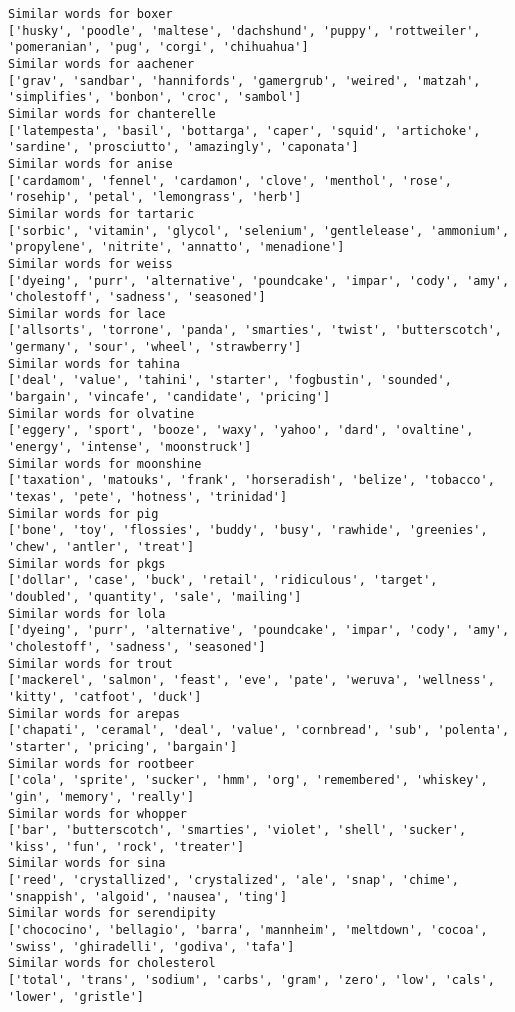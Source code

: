 \documentclass[11pt]{article}
\begin{document}
\begin{Verbatim}[commandchars=\\\{\}]
Similar words for boxer
['husky', 'poodle', 'maltese', 'dachshund', 'puppy', 'rottweiler', 'pomeranian', 'pug', 'corgi', 'chihuahua']
Similar words for aachener
['grav', 'sandbar', 'hannifords', 'gamergrub', 'weired', 'matzah', 'simplifies', 'bonbon', 'croc', 'sambol']
Similar words for chanterelle
['latempesta', 'basil', 'bottarga', 'caper', 'squid', 'artichoke', 'sardine', 'prosciutto', 'amazingly', 'caponata']
Similar words for anise
['cardamom', 'fennel', 'cardamon', 'clove', 'menthol', 'rose', 'rosehip', 'petal', 'lemongrass', 'herb']
Similar words for tartaric
['sorbic', 'vitamin', 'glycol', 'selenium', 'gentlelease', 'ammonium', 'propylene', 'nitrite', 'annatto', 'menadione']
Similar words for weiss
['dyeing', 'purr', 'alternative', 'poundcake', 'impar', 'cody', 'amy', 'cholestoff', 'sadness', 'seasoned']
Similar words for lace
['allsorts', 'torrone', 'panda', 'smarties', 'twist', 'butterscotch', 'germany', 'sour', 'wheel', 'strawberry']
Similar words for tahina
['deal', 'value', 'tahini', 'starter', 'fogbustin', 'sounded', 'bargain', 'vincafe', 'candidate', 'pricing']
Similar words for olvatine
['eggery', 'sport', 'booze', 'waxy', 'yahoo', 'dard', 'ovaltine', 'energy', 'intense', 'moonstruck']
Similar words for moonshine
['taxation', 'matouks', 'frank', 'horseradish', 'belize', 'tobacco', 'texas', 'pete', 'hotness', 'trinidad']
Similar words for pig
['bone', 'toy', 'flossies', 'buddy', 'busy', 'rawhide', 'greenies', 'chew', 'antler', 'treat']
Similar words for pkgs
['dollar', 'case', 'buck', 'retail', 'ridiculous', 'target', 'doubled', 'quantity', 'sale', 'mailing']
Similar words for lola
['dyeing', 'purr', 'alternative', 'poundcake', 'impar', 'cody', 'amy', 'cholestoff', 'sadness', 'seasoned']
Similar words for trout
['mackerel', 'salmon', 'feast', 'eve', 'pate', 'weruva', 'wellness', 'kitty', 'catfoot', 'duck']
Similar words for arepas
['chapati', 'ceramal', 'deal', 'value', 'cornbread', 'sub', 'polenta', 'starter', 'pricing', 'bargain']
Similar words for rootbeer
['cola', 'sprite', 'sucker', 'hmm', 'org', 'remembered', 'whiskey', 'gin', 'memory', 'really']
Similar words for whopper
['bar', 'butterscotch', 'smarties', 'violet', 'shell', 'sucker', 'kiss', 'fun', 'rock', 'treater']
Similar words for sina
['reed', 'crystallized', 'crystalized', 'ale', 'snap', 'chime', 'snappish', 'algoid', 'nausea', 'ting']
Similar words for serendipity
['chococino', 'bellagio', 'barra', 'mannheim', 'meltdown', 'cocoa', 'swiss', 'ghiradelli', 'godiva', 'tafa']
Similar words for cholesterol
['total', 'trans', 'sodium', 'carbs', 'gram', 'zero', 'low', 'cals', 'lower', 'gristle']

\end{Verbatim}
\end{document}

